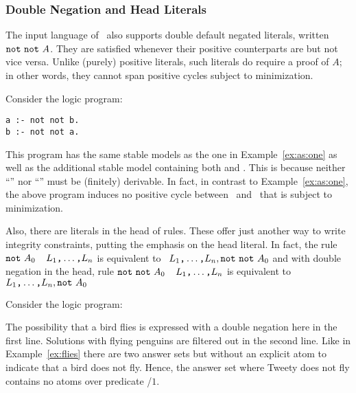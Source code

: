 \subsubsection{Double Negation and Head Literals}\label{subsec:gringo:double}

The input language of \gringo\ also supports double default negated literals,
written $\texttt{not}~\texttt{not}~A$.
They are satisfied whenever their positive counterparts are but not vice versa.
Unlike (purely) positive literals,
such literals do require a proof of $A$;
in other words, they cannot span positive cycles subject to minimization.

Consider the logic program:
\begin{lstlisting}[numbers=none]
a :- not not b.
b :- not not a.
\end{lstlisting}
%
This program has the same stable models as the one in Example~\ref{ex:as:one}
as well as the additional stable model containing both  and .
This is because neither ``'' nor ``'' must be (finitely) derivable.
In fact, in contrast to Example~\ref{ex:as:one},
the above program induces no positive cycle between~ and~ that is subject to minimization.

Also, there are literals in the head of rules.
These offer just another way to write integrity constraints,
putting the emphasis on the head literal.
In fact, the rule
\(\texttt{not}~A_0\)~\code{:-}~\(L_1\text{\texttt{,}}\dots\text{\texttt{,}}L_n\)
is equivalent to
\code{:-}~\(L_1\text{\texttt{,}}\dots\text{\texttt{,}}L_n,\texttt{not}~\texttt{not}~A_0\)
and with double negation in the head, rule
\(\texttt{not}~\texttt{not}~A_0\)~\code{:-}~\(L_1\text{\texttt{,}}\dots\text{\texttt{,}}L_n\)
is equivalent to
\code{:-}~\(L_1\text{\texttt{,}}\dots\text{\texttt{,}}L_n,\texttt{not}~A_0\)

\begin{example}\label{ex:as:flynn}
Consider the logic program:


The possibility that a bird flies is expressed with a double negation here in the first line.
Solutions with flying penguins are filtered out in the second line.
Like in Example~\ref{ex:flies} there are two answer sets
but without an explicit atom to indicate that a bird does not fly.
Hence, the answer set where Tweety does not fly contains no atoms over predicate /$1$.
\eexample
\end{example}

